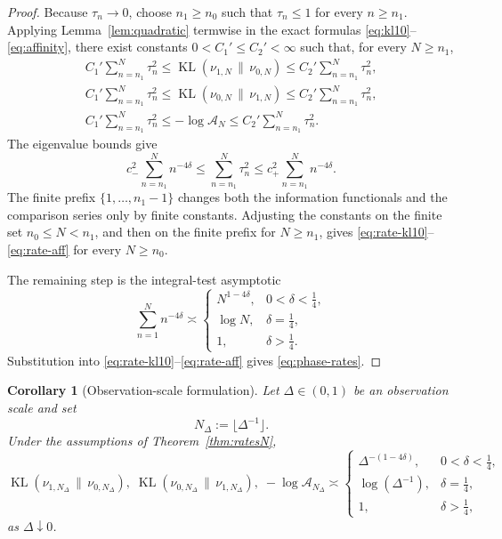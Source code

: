 \documentclass[11pt,a4paper]{amsart}
\theoremstyle{plain}
\newtheorem{corollary}[theorem]{Corollary}
\theoremstyle{definition}
\theoremstyle{remark}
\DeclareMathOperator{\KL}{KL}
\newcommand{\Acal}{\mathcal A}
\begin{document}
\begin{proof}
Because \(\tau_n\to0\), choose \(n_1\ge n_0\) such that \(\tau_n\le1\) for every
\(n\ge n_1\).  Applying Lemma~\ref{lem:quadratic} termwise in the exact formulas
\eqref{eq:kl10}--\eqref{eq:affinity}, there exist constants
\(0<C_1'\le C_2'<\infty\) such that, for every \(N\ge n_1\),
\begin{align*}
C_1' \sum_{n=n_1}^N \tau_n^2
\le
\KL(\nu_{1,N}\,\|\,\nu_{0,N})
\le
C_2' \sum_{n=n_1}^N \tau_n^2,\\
C_1' \sum_{n=n_1}^N \tau_n^2
\le
\KL(\nu_{0,N}\,\|\,\nu_{1,N})
\le
C_2' \sum_{n=n_1}^N \tau_n^2,\\
C_1' \sum_{n=n_1}^N \tau_n^2
\le
-\log \Acal_N
\le
C_2' \sum_{n=n_1}^N \tau_n^2.
\end{align*}
The eigenvalue bounds give
\[
c_-^2 \sum_{n=n_1}^N n^{-4\delta}
\le
\sum_{n=n_1}^N \tau_n^2
\le
c_+^2 \sum_{n=n_1}^N n^{-4\delta}.
\]
The finite prefix \(\{1,\dots,n_1-1\}\) changes both the information functionals and the comparison
series only by finite constants.  Adjusting the constants on the finite set
\(n_0\le N<n_1\), and then on the finite prefix for \(N\ge n_1\), gives
\eqref{eq:rate-kl10}--\eqref{eq:rate-aff} for every \(N\ge n_0\).

The remaining step is the integral-test asymptotic
\[
\sum_{n=1}^N n^{-4\delta}
\asymp
\begin{cases}
N^{1-4\delta}, & 0<\delta<\tfrac14,\\[4pt]
\log N, & \delta=\tfrac14,\\[4pt]
1, & \delta>\tfrac14.
\end{cases}
\]
Substitution into \eqref{eq:rate-kl10}--\eqref{eq:rate-aff} gives \eqref{eq:phase-rates}.
\end{proof}

\begin{corollary}[Observation-scale formulation]\label{cor:delta}
Let $\Delta\in(0,1)$ be an observation scale and set
\[
N_\Delta := \lfloor \Delta^{-1}\rfloor.
\]
Under the assumptions of Theorem~\ref{thm:ratesN},
\begin{equation}\label{eq:delta-rates}
\KL(\nu_{1,N_\Delta}\,\|\,\nu_{0,N_\Delta}),
\;
\KL(\nu_{0,N_\Delta}\,\|\,\nu_{1,N_\Delta}),
\;
-\log \Acal_{N_\Delta}
\asymp
\begin{cases}
\Delta^{-(1-4\delta)}, & 0<\delta<\tfrac14,\\[4pt]
\log(\Delta^{-1}), & \delta=\tfrac14,\\[4pt]
1, & \delta>\tfrac14,
\end{cases}
\end{equation}
as $\Delta\downarrow0$.
\end{corollary}
\end{document}
